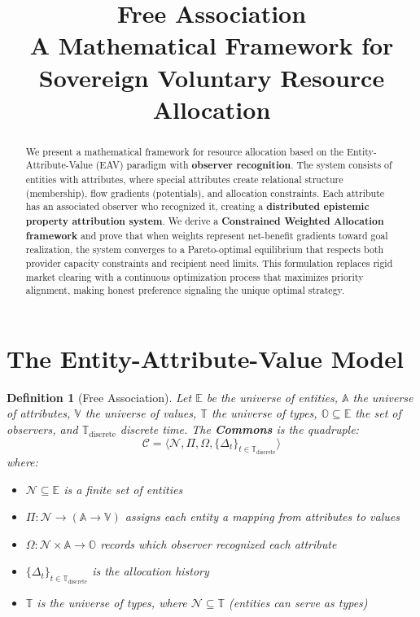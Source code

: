 \documentclass[11pt]{article}
\title{\textbf{Free Association}\\
\large A Mathematical Framework for Sovereign Voluntary Resource Allocation}
\author{}
\date{}
\newtheorem{definition}{Definition}
\begin{document}
\maketitle

\begin{abstract}
We present a mathematical framework for resource allocation based on the Entity-Attribute-Value (EAV) paradigm with \textbf{observer recognition}. The system consists of entities with attributes, where special attributes create relational structure (membership), flow gradients (potentials), and allocation constraints. Each attribute has an associated observer who recognized it, creating a \textbf{distributed epistemic property attribution system}. We derive a \textbf{Constrained Weighted Allocation framework} and prove that when weights represent net-benefit gradients toward goal realization, the system converges to a Pareto-optimal equilibrium that respects both provider capacity constraints and recipient need limits. This formulation replaces rigid market clearing with a continuous optimization process that maximizes priority alignment, making honest preference signaling the unique optimal strategy.
\end{abstract}

\section{The Entity-Attribute-Value Model}

\begin{definition}[Free Association]
Let $\mathbb{E}$ be the universe of entities, $\mathbb{A}$ the universe of attributes, $\mathbb{V}$ the universe of values, $\mathbb{T}$ the universe of types, $\mathbb{O} \subseteq \mathbb{E}$ the set of observers, and $\mathbb{T}_{\text{discrete}}$ discrete time. The \textbf{Commons} is the quadruple:
\[
\mathcal{C} = \langle \mathcal{N}, \Pi, \Omega, \{\Delta_t\}_{t \in \mathbb{T}_{\text{discrete}}} \rangle
\]
where:
\begin{itemize}
\item $\mathcal{N} \subseteq \mathbb{E}$ is a finite set of entities
\item $\Pi: \mathcal{N} \to (\mathbb{A} \to \mathbb{V})$ assigns each entity a mapping from attributes to values
\item $\Omega: \mathcal{N} \times \mathbb{A} \to \mathbb{O}$ records which observer recognized each attribute
\item $\{\Delta_t\}_{t \in \mathbb{T}_{\text{discrete}}}$ is the allocation history
\item $\mathbb{T}$ is the universe of types, where $\mathcal{N} \subseteq \mathbb{T}$ (entities can serve as types)
\end{itemize}
\end{definition}
\end{document}
